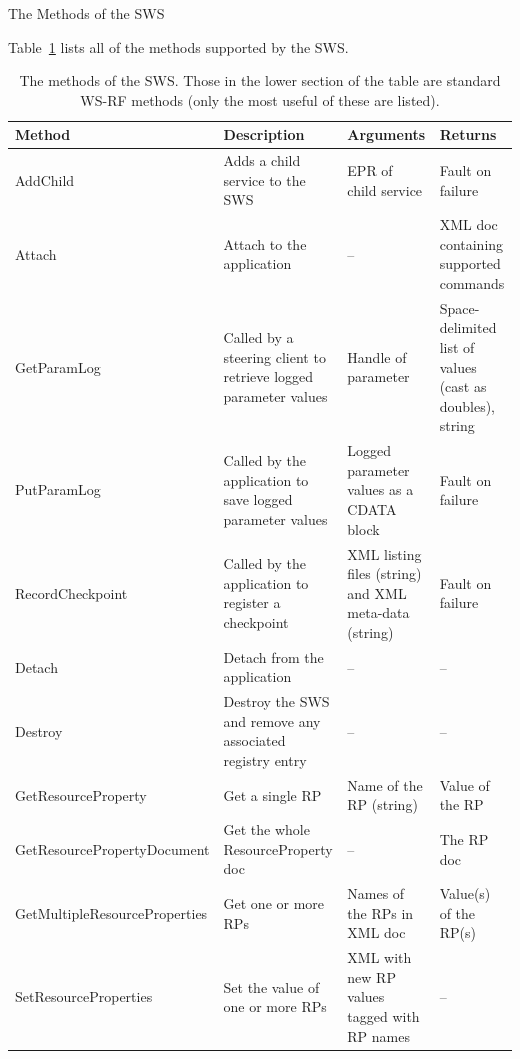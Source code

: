 \documentclass[a4paper]{article}
\begin{document}
\begin{section}{The Methods of the SWS}
\label{sec:swsMethods}

Table~\ref{table:SWSmethods} lists all of the methods supported by the
SWS.

\begin{table}
\begin{center}
\begin{tabular}{l|p{4cm}|p{4cm}|p{3cm}}
\hline\hline
Method & Description & Arguments & Returns\\
\hline
AddChild & Adds a child service to the SWS 
& EPR of child service  
& Fault on failure \\

Attach & Attach to the application & -- 
& XML doc containing supported commands\\

GetParamLog & Called by a steering client to retrieve logged parameter values 
& Handle of parameter 
& Space-delimited list of values (cast as doubles), string \\

PutParamLog & Called by the application to save logged parameter values 
& Logged parameter values as a CDATA block
& Fault on failure \\

RecordCheckpoint & Called by the application to register a checkpoint 
& XML listing files (string) and XML meta-data (string)
& Fault on failure \\

Detach & Detach from the application & -- & --\\
\hline
Destroy & Destroy the SWS and remove any associated registry entry & -- &--\\
GetResourceProperty & Get a single RP & Name of the RP (string) 
& Value of the RP \\

GetResourcePropertyDocument & Get the whole ResourceProperty doc 
& -- & The RP doc\\

GetMultipleResourceProperties & Get one or more RPs 
& Names of the RPs in XML doc & Value(s) of the RP(s) \\
SetResourceProperties & Set the value of one or more RPs 
& XML with new RP values tagged with RP names & -- \\
\hline\hline
\end{tabular}
\end{center}
\caption{The methods of the SWS.  Those in the lower section of the table 
are standard WS-RF methods (only the most useful of these are listed).}
\label{table:SWSmethods}
\end{table}

\end{section}
\end{document}
